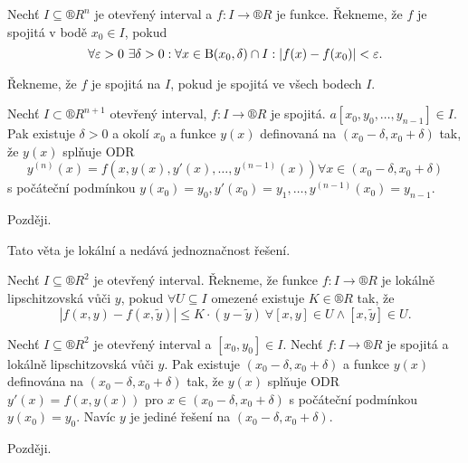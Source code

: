 \documentclass[12pt]{article}                   %
\begin{document}
        \begin{definice}
            Nechť $I \subseteq ®R^n$ je otevřený interval a $f: I \rightarrow ®R$ je funkce. Řekneme, že $f$ je spojitá v bodě $x_0 \in I$, pokud
            $$ \forall \varepsilon > 0\ \exists \delta > 0: \forall x \in \operatorname{B}(x_0, \delta) \cap I: |f(x) - f(x_0)| < \varepsilon. $$

            Řekneme, že $f$ je spojitá na $I$, pokud je spojitá ve všech bodech $I$.
        \end{definice}

        \begin{veta}[Peano s $y^{(n)}$]
            Nechť $I \subset ®R^{n+1}$ otevřený interval, $f: I \rightarrow ®R$ je spojitá. $a[x_0, y_0, …, y_{n-1}] \in I$. Pak existuje $\delta > 0$ a okolí $x_0$ a funkce $y(x)$ definovaná na $(x_0 - \delta, x_0 + \delta)$ tak, že $y(x)$ splňuje ODR
            $$ y^{(n)}(x) = f(x, y(x), y'(x), …, y^{(n-1)}(x)) \forall x \in (x_0 - \delta, x_0 + \delta) $$
            s počáteční podmínkou $y(x_0) = y_0, y'(x_0) = y_1, …, y^{(n-1)}(x_0) = y_{n-1}$.

            \begin{dukazin}
                Později.
            \end{dukazin}

            \begin{upozorneni}
                Tato věta je lokální a nedává jednoznačnost řešení.
            \end{upozorneni}
        \end{veta}

        \begin{definice}
            Nechť $I \subseteq ®R^2$ je otevřený interval. Řekneme, že funkce $f: I \rightarrow ®R$ je lokálně lipschitzovská vůči $y$, pokud $\forall U \subseteq I$ omezené existuje $K \in ®R$ tak, že
            $$ |f(x, y) - f(x, \tilde{y})| ≤ K·(y - \tilde{y})\  \forall [x, y] \in U \land [x, \tilde{y}] \in U. $$ 
        \end{definice}

        \begin{veta}[Picard]
            Nechť $I \subseteq ®R^2$ je otevřený interval a $[x_0, y_0] \in I$. Nechť $f: I \rightarrow ®R$ je spojitá a lokálně lipschitzovská vůči $y$. Pak existuje $(x_0 - \delta, x_0 + \delta)$ a funkce $y(x)$ definována na $(x_0 - \delta, x_0 + \delta)$ tak, že $y(x)$ splňuje ODR $y'(x) = f(x, y(x))$ pro $x \in (x_0 - \delta, x_0 + \delta)$ s počáteční podmínkou $y(x_0) = y_0$. Navíc $y$ je jediné řešení na $(x_0 - \delta, x_0 + \delta)$.

            \begin{dukazin}
                Později.
            \end{dukazin}
        \end{veta}
\end{document}
